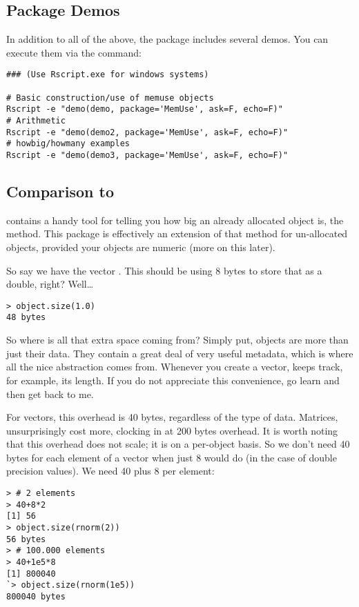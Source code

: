 \subsection{Package Demos}

In addition to all of the above, the  package includes several demos.  You can execute them via the command:
\begin{lstlisting}[title=List of Demos]
### (Use Rscript.exe for windows systems)

# Basic construction/use of memuse objects
Rscript -e "demo(demo, package='MemUse', ask=F, echo=F)"
# Arithmetic
Rscript -e "demo(demo2, package='MemUse', ask=F, echo=F)"
# howbig/howmany examples
Rscript -e "demo(demo3, package='MemUse', ask=F, echo=F)"
\end{lstlisting}



\subsection{Comparison to }

 contains a handy tool for telling you how big an already allocated object is, the  method.  This package is effectively an extension of that method for un-allocated objects, provided your objects are numeric (more on this later).

So say we have the vector .  This should be using 8 bytes to store that  as a double, right?  Well\dots
\begin{lstlisting}[language=rr]
> object.size(1.0)
48 bytes
\end{lstlisting}

So where is all that extra space coming from?  Simply put,  objects are more than just their data.  They contain a great deal of very useful metadata, which is where all the nice abstraction comes from.  Whenever you create a vector,  keeps track, for example, its length.  If you do not appreciate this convenience, go learn  and then get back to me.  

For vectors, this overhead is 40 bytes, regardless of the type of data.  Matrices, unsurprisingly cost more, clocking in at 200 bytes overhead.  It is worth noting that this overhead does not scale; it is on a per-object basis.  So we don't need 40 bytes for each element of a vector when just 8 would do (in the case of double precision values).  We need 40 plus 8 per element:
\begin{lstlisting}[language=rr]
> # 2 elements
> 40+8*2
[1] 56
> object.size(rnorm(2))
56 bytes
> # 100.000 elements
> 40+1e5*8
[1] 800040
`> object.size(rnorm(1e5))
800040 bytes
\end{lstlisting}


